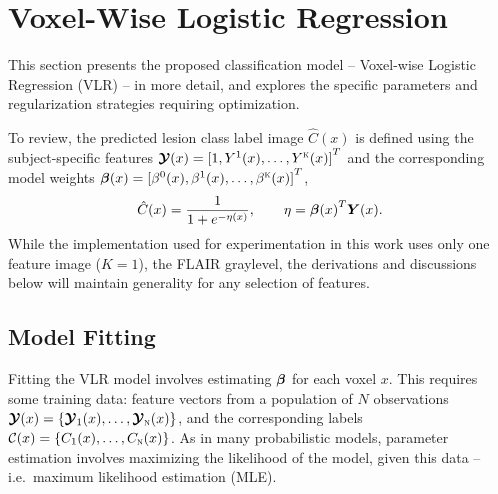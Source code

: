 \chapter{Voxel-Wise Logistic Regression}\label{ch-vlr}
This section presents the proposed classification model
-- Voxel-wise Logistic Regression (VLR) --
in more detail, and explores the specific parameters and regularization strategies
requiring optimization.
\par
To review, the predicted lesion class label image $\hat{C}(x)$ is defined
using the subject-specific features $\bm{\mathcal{Y}}(x) = {[1,Y^1(x),\dots,Y^{\textsc{k}}(x)]}^T$
and the corresponding model weights $\bm{\beta}(x) = {[\beta^0(x),\beta^1(x),\dots,\beta^{\textsc{k}}(x)]}^T$,
\begin{equation}
  \hat{C}(x) = \frac{1}{1+e^{-\eta(x)}},\qquad\eta = {\bb(x)}^T\bm{Y}(x).%
  \label{eq:eq:vlrmodel}
\end{equation}
While the implementation used for experimentation in this work
uses only one feature image ($K=1$), the FLAIR graylevel,
the derivations and discussions below will maintain generality for any selection of features.
\section{Model Fitting}\label{ss:modelfitting}
Fitting the VLR model involves estimating $\bm{\beta}$ for each voxel $x$.
This requires some training data:
feature vectors from a population of $N$ observations $\bm{\mathcal{Y}}(x) = \{\bm{\mathcal{Y}}_1(x),\dots,\bm{\mathcal{Y}}_{\textsc{n}}(x)\}$,
and the corresponding labels $\mathcal{C}(x) = \{C_1(x),\dots,C_{\textsc{n}}(x)\}$. 
As in many probabilistic models,
parameter estimation involves maximizing the likelihood of the model, given this data --
i.e.\ maximum likelihood estimation (MLE).
